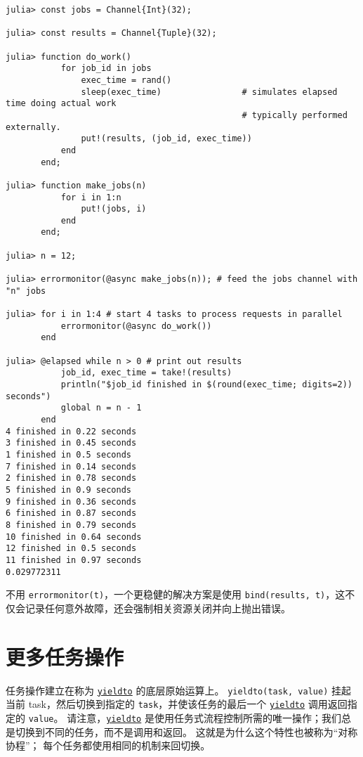 \begin{verbatim}
julia> const jobs = Channel{Int}(32);

julia> const results = Channel{Tuple}(32);

julia> function do_work()
           for job_id in jobs
               exec_time = rand()
               sleep(exec_time)                # simulates elapsed time doing actual work
                                               # typically performed externally.
               put!(results, (job_id, exec_time))
           end
       end;

julia> function make_jobs(n)
           for i in 1:n
               put!(jobs, i)
           end
       end;

julia> n = 12;

julia> errormonitor(@async make_jobs(n)); # feed the jobs channel with "n" jobs

julia> for i in 1:4 # start 4 tasks to process requests in parallel
           errormonitor(@async do_work())
       end

julia> @elapsed while n > 0 # print out results
           job_id, exec_time = take!(results)
           println("$job_id finished in $(round(exec_time; digits=2)) seconds")
           global n = n - 1
       end
4 finished in 0.22 seconds
3 finished in 0.45 seconds
1 finished in 0.5 seconds
7 finished in 0.14 seconds
2 finished in 0.78 seconds
5 finished in 0.9 seconds
9 finished in 0.36 seconds
6 finished in 0.87 seconds
8 finished in 0.79 seconds
10 finished in 0.64 seconds
12 finished in 0.5 seconds
11 finished in 0.97 seconds
0.029772311
\end{verbatim}



不用 \texttt{errormonitor(t)}，一个更稳健的解决方案是使用 \texttt{bind(results, t)}，这不仅会记录任何意外故障，还会强制相关资源关闭并向上抛出错误。



\hypertarget{6751487137488414273}{}


\section{更多任务操作}



任务操作建立在称为 \hyperlink{4920987536368477483}{\texttt{yieldto}} 的底层原始运算上。 \texttt{yieldto(task, value)} 挂起当前 task，然后切换到指定的 \texttt{task}，并使该任务的最后一个 \hyperlink{4920987536368477483}{\texttt{yieldto}} 调用返回指定的 \texttt{value}。 请注意，\hyperlink{4920987536368477483}{\texttt{yieldto}} 是使用任务式流程控制所需的唯一操作；我们总是切换到不同的任务，而不是调用和返回。 这就是为什么这个特性也被称为“对称协程”； 每个任务都使用相同的机制来回切换。



